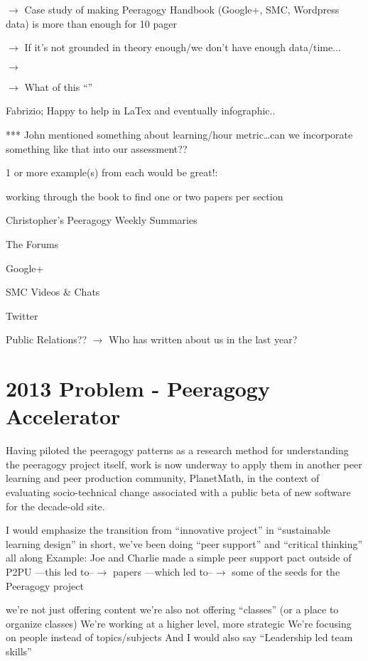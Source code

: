 \documentclass[twoside]{article}
\begin{document}
\begin{multicols}{2}
$\rightarrow$ Case study of making Peeragogy Handbook (Google+, SMC, Wordpress data) is more than enough for 10 pager

$\rightarrow$ If it's not grounded in theory enough/we don't have enough data/time...

$\rightarrow$

$\rightarrow$ What of this ``''


Fabrizio; Happy to help in LaTex and eventually infographic..

*** John mentioned something about learning/hour metric\ldots can we incorporate something like that into our assessment??

    1 or more example(s) from each would be great!:

        working through the book to find one or two papers per section

        Christopher's Peeragogy Weekly Summaries

        The Forums

        Google+

        SMC Videos \& Chats

        Twitter

    Public Relations?? $\rightarrow$ Who has written about us in the last year?


%
%
%
%

\section{2013 Problem - Peeragogy Accelerator}

Having piloted the peeragogy patterns as a research method for understanding the peeragogy project itself, work is now underway to apply them in another peer learning and peer production community, PlanetMath, in the context of evaluating socio-technical change associated with a public beta of new software for the decade-old site.

I would emphasize the transition from ``innovative project'' in ``sustainable learning design'' in short, we've been doing ``peer support'' and ``critical thinking'' all along
Example: Joe and Charlie made a simple peer support pact outside of P2PU ---this led to--$\rightarrow$ papers ---which led to--$\rightarrow$ some of the seeds for the Peeragogy project

we're not just offering content
we're also not offering ``classes'' (or a place to organize classes)
We're working at a higher level, more strategic
We're focusing on people instead of topics/subjects
And I would also say ``Leadership led team skills''


\end{multicols}
\end{document}

